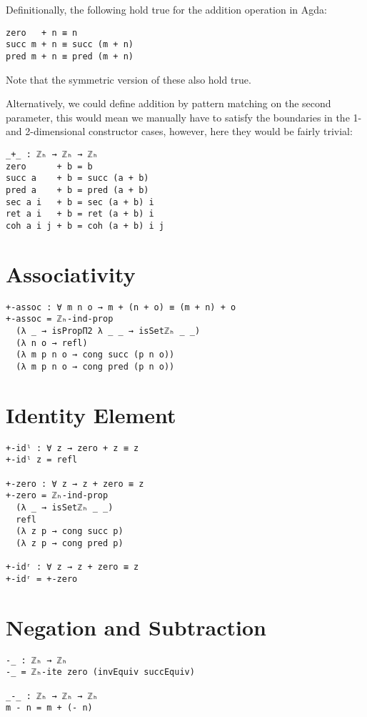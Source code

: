Definitionally, the following hold true for the addition operation in Agda:
\begin{verbatim}
zero   + n ≡ n
succ m + n ≡ succ (m + n)
pred m + n ≡ pred (m + n)
\end{verbatim}
Note that the symmetric version of these also hold true.

Alternatively, we could define addition by pattern matching on the second parameter, this would mean we manually have to satisfy the boundaries in the 1- and 2-dimensional constructor cases, however, here they would be fairly trivial:
\begin{verbatim}
_+_ : ℤₕ → ℤₕ → ℤₕ
zero      + b = b
succ a    + b = succ (a + b)
pred a    + b = pred (a + b)
sec a i   + b = sec (a + b) i
ret a i   + b = ret (a + b) i
coh a i j + b = coh (a + b) i j
\end{verbatim}

\section{Associativity}
\begin{verbatim}
+-assoc : ∀ m n o → m + (n + o) ≡ (m + n) + o
+-assoc = ℤₕ-ind-prop
  (λ _ → isPropΠ2 λ _ _ → isSetℤₕ _ _)
  (λ n o → refl)
  (λ m p n o → cong succ (p n o))
  (λ m p n o → cong pred (p n o))
\end{verbatim}

\section{Identity Element}
\begin{verbatim}
+-idˡ : ∀ z → zero + z ≡ z
+-idˡ z = refl

+-zero : ∀ z → z + zero ≡ z
+-zero = ℤₕ-ind-prop
  (λ _ → isSetℤₕ _ _)
  refl
  (λ z p → cong succ p)
  (λ z p → cong pred p)

+-idʳ : ∀ z → z + zero ≡ z
+-idʳ = +-zero
\end{verbatim}

\section{Negation and Subtraction}
\begin{verbatim}
-_ : ℤₕ → ℤₕ
-_ = ℤₕ-ite zero (invEquiv succEquiv)

_-_ : ℤₕ → ℤₕ → ℤₕ
m - n = m + (- n)
\end{verbatim}

